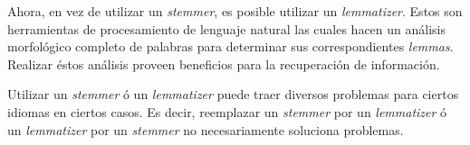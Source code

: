 		Ahora, en vez de utilizar un \textit{stemmer}, es posible utilizar un \textit{lemmatizer}. Estos son herramientas de procesamiento de lenguaje natural las cuales hacen un análisis morfológico completo de palabras para determinar sus correspondientes \textit{lemmas}. Realizar éstos análisis proveen beneficios para la recuperación de información. \par
		
		Utilizar un \textit{stemmer} ó un \textit{lemmatizer} puede traer diversos problemas para ciertos idiomas en ciertos casos. Es decir, reemplazar un \textit{stemmer} por un \textit{lemmatizer} ó un \textit{lemmatizer} por un \textit{stemmer} no necesariamente soluciona problemas.
					
